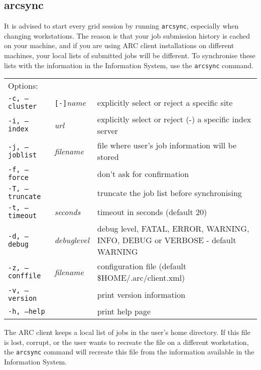 \subsection{arcsync}
\label{sec:arcsync}

It is advised to start every grid session by running \texttt{arcsync},
especially when changing workstations. The reason is that your job submission
history is cached on your machine, and if you are using ARC client
installations on different machines, your local lists of submitted jobs will be different. To synchronise
these lists with the information in the Information System, use the
\texttt{arcsync}  command.

\hspace*{0.5cm}
\begin{shaded}
\end{shaded}
\begin{longtable}{llp{8cm}}
   Options:&&\\
   \texttt{-c, --cluster}&\verb#[-]#\textit{name}&explicitly select or reject a specific site\\
   \texttt{-i, --index}&\textit{url}&explicitly select or reject (-) a specific index server\\
   \texttt{-j, --joblist}&\textit{filename}&file where user's job information will be stored\\
   \texttt{-f, --force}& &don't ask for confirmation\\
   \texttt{-T, --truncate}& &truncate the job list before synchronising\\
   \texttt{-t, --timeout}&\textit{seconds}&timeout in seconds (default 20)\\
   \texttt{-d, --debug}&\textit{debuglevel}&debug level, FATAL, ERROR, WARNING, INFO, DEBUG or VERBOSE - default WARNING\\
   \texttt{-z, --conffile}&\textit{filename}& configuration file (default {\$}HOME/.arc/client.xml)\\
   \texttt{-v, --version}&&print version information\\
   \texttt{-h, --help}&&print help page\\
\end{longtable}

The ARC client keeps a local list of jobs in the user's home
directory. If this file is lost,
corrupt, or the user wants to recreate the file on a different
workstation, the \texttt{arcsync} command will recreate this file from
the information available in the Information System.

